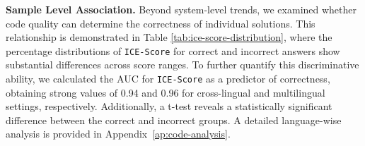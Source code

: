 \textbf{Sample Level Association.}
Beyond system-level trends, we examined whether code quality can determine the correctness of individual solutions.
%
This relationship is demonstrated in Table \ref{tab:ice-score-distribution}, where the percentage distributions of \texttt{ICE-Score} for correct and incorrect answers show substantial differences across score ranges.
%
% 
To further quantify this discriminative ability, we calculated the AUC for \texttt{ICE-Score} as a predictor of correctness, obtaining strong values of 0.94 and 0.96 for cross-lingual and multilingual settings, respectively.
% 
Additionally, a t-test reveals a statistically significant difference between the correct and incorrect groups.
A detailed language-wise analysis is provided in Appendix~\ref{ap:code-analysis}.
%
\begin{table}[htbp]
\end{table}

